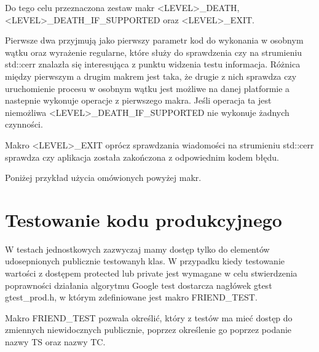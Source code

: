 \documentclass[12pt,a4paper,notitlepage]{report}
\begin{document}
Do tego celu przeznaczona zestaw makr <LEVEL>{\_}DEATH, <LEVEL>{\_}DEATH{\_}IF{\_}SUPPORTED oraz <LEVEL>{\_}EXIT. 

Pierwsze dwa przyjmują jako pierwszy parametr kod do wykonania w osobnym wątku oraz wyrażenie regularne, które służy do sprawdzenia czy na strumieniu std::cerr znalazła się interesująca z punktu widzenia testu informacja. Różnica między pierwszym a drugim makrem jest taka, że drugie z nich sprawdza czy uruchomienie procesu w osobnym wątku jest możliwe na danej platformie a nastepnie wykonuje operacje z pierwszego makra. Jeśli operacja ta jest niemożliwa <LEVEL>{\_}DEATH{\_}IF{\_}SUPPORTED nie wykonuje żadnych czynności.

Makro <LEVEL>{\_}EXIT oprócz sprawdzania wiadomości na strumieniu std::cerr sprawdza czy aplikacja została zakończona z odpowiednim kodem błędu.

Poniżej przykład użycia omówionych powyżej makr.

			

\section{Testowanie kodu produkcyjnego}

W testach jednostkowych zazwyczaj mamy dostęp tylko do elementów udosepnionych publicznie testowanyh klas. W przypadku kiedy testowanie wartości z dostępem protected lub private jest wymagane w celu stwierdzenia poprawności działania algorytmu Google test dostarcza nagłówek gtest\\gtest{\_}prod.h, w którym zdefiniowane jest makro FRIEND{\_}TEST.

Makro FRIEND{\_}TEST pozwala określić, który z testów ma mieć dostęp do zmiennych niewidocznych publicznie, poprzez określenie go poprzez podanie nazwy TS oraz nazwy TC.

			
\end{document}
